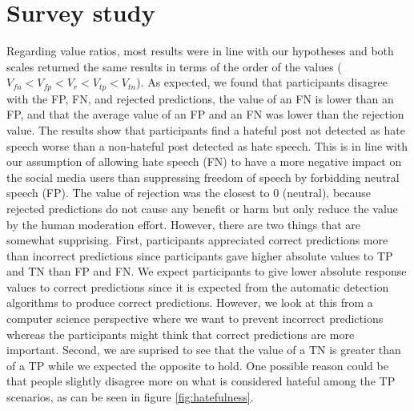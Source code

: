 \section{Survey study}
\label{sec:discussion-survey}
Regarding value ratios, most results were in line with our hypotheses and both scales returned the same results in terms of the order of the values ($V_{fn} < V_{fp} < V_{r} < V_{tp} < V_{tn}$).
%
As expected, we found that participants disagree with the FP, FN, and rejected predictions, the value of an FN is lower than an FP, and that the average value of an FP and an FN was lower than the rejection value.
%
The results show that participants find a hateful post not detected as hate speech worse than a non-hateful post detected as hate speech.
%
This is in line with our assumption of allowing hate speech (FN) to have a more negative impact on the social media users than suppressing freedom of speech by forbidding neutral speech (FP).
%
The value of rejection was the closest to 0 (neutral), because rejected predictions do not cause any benefit or harm but only reduce the value by the human moderation effort.
%
However, there are two things that are somewhat supprising.
%
First, participants appreciated correct predictions more than incorrect predictions since participants gave higher absolute values to TP and TN than FP and FN.
%
We expect participants to give lower absolute response values to correct predictions since it is expected from the automatic detection algorithms to produce correct predictions.
%
However, we look at this from a computer science perspective where we want to prevent incorrect predictions whereas the participants might think that correct predictions are more important.
%
Second, we are suprised to see that the value of a TN is greater than of a TP while we expected the opposite to hold.
%
One possible reason could be that people slightly disagree more on what is considered hateful among the TP scenarios, as can be seen in figure \ref{fig:hatefulness}.
%

%

